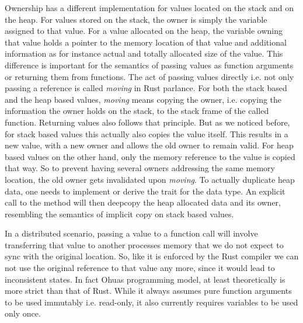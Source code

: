 Ownership has a different implementation for values located on the stack and on the heap. For values stored on the stack, the owner is simply the variable assigned to that value. For a value allocated on the heap, the variable owning that value holds a pointer to the memory location of that value and additional information as for instance actual and totally allocated size of the value. This difference is important for the semantics of passing values as function arguments or returning them from functions. The act of passing values directly i.e. not only passing a reference is called \emph{moving} in Rust parlance. For both the stack based and the heap based values, \emph{moving} means copying the owner, i.e. copying the information the owner holds on the stack, to the stack frame of the called function. Returning values also follows that principle. But as we noticed before, for stack based values this actually also copies the value itself. This results in a new value, with a new owner and allows the old owner to remain valid. For heap based values on the other hand, only the memory reference to the value is copied that way. So to prevent having several owners addressing the same memory location, the old owner gets invalidated upon \emph{moving}. To actually duplicate heap data, one needs to implement or derive the  trait for the data type. An explicit call to the  method will then deepcopy the heap allocated data and its owner, resembling the semantics of implicit copy on stack based values.

In a distributed scenario, passing a value to a function call will involve transferring that value to another processes memory that we do not expect to sync with the original location. So, like it is enforced by the Rust compiler we can not use the original reference to that value any more, since it would lead to inconsistent states. In fact Ohuas programming model, at least theoretically is more strict than that of Rust. While it always assumes pure function arguments to be used immutably i.e. read-only, it also currently requires variables to be used only once. 

